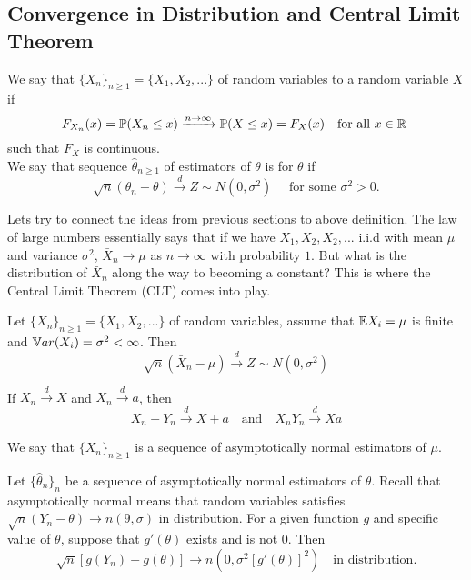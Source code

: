\subsection{Convergence in Distribution and Central Limit Theorem}
\begin{definition} 
    We say that $\{ X_n \}_{n \geq 1}  = \{ X_1,X_2,... \}$ of random variables  to a random variable $X$ if 
    $$
    F_{X_n}(x) = \mathbb P(X_n \leq x) \xrightarrow{n \to \infty} \mathbb P(X \leq x) = F_{X}(x) \quad \text{for all } x \in \mathbb R \
    $$
    such that $F_X$ is continuous.\\
    We say that sequence $\hat{\theta}_{n \geq 1}$ of estimators of $\theta$ is  for $\theta$ if 
    $$
    \sqrt{n}(\theta_n - \theta) \xrightarrow{d} Z \sim N(0,\sigma^2) \quad \text{ for some } \sigma^2 >0.
    $$
\end{definition}
Lets try to connect the ideas from previous sections to above definition. The law of large numbers essentially says that if we have $X_1,X_2,X_2,...$ i.i.d with mean $\mu$ and variance $\sigma^2$, $\bar{X}_n \to \mu$ as $n \to \infty$ with probability $1$. But what is the distribution of $\bar{X}_n$ along the way to becoming a constant? This is where the Central Limit Theorem (CLT) comes into play. 
\begin{theorem}
    Let $\{ X_n \}_{n \geq 1}  = \{ X_1,X_2,... \}$ of random variables, assume that $\mathbb E X_i = \mu$ is finite and $\mathbb V ar(X_i) = \sigma^2 < \infty$.
    Then 
    $$
    \sqrt{n}(\bar{X}_n - \mu) \xrightarrow{d} Z \sim N(0,\sigma^2)
    $$
\end{theorem}

If $X_n \xrightarrow{d} X$ and $X_n \xrightarrow{d} a$, then
    $$
    X_n + Y_n \xrightarrow{d} X + a \quad \text{and} \quad
    X_nY_n \xrightarrow{d} Xa
    $$

We say that $\{ X_n \}_{n \geq 1}$ is a sequence of asymptotically normal estimators of $\mu$.
\begin{note}
     Let $\{ \hat{\theta}_n \}_n$ be a sequence of asymptotically normal estimators of $\theta$. Recall that asymptotically normal means that random variables satisfies $\sqrt{n}(Y_n - \theta) \to n(9,\sigma)$ in distribution. For a given function $g$ and specific value of $\theta$, suppose that $g'(\theta)$ exists and is not $0$. Then 
    $$
    \sqrt{n}[g(Y_n)-g(\theta)] \to n(0,\sigma^2[g'(\theta)]^2) \quad \text{in distribution.} 
    $$ 
    
\end{note}